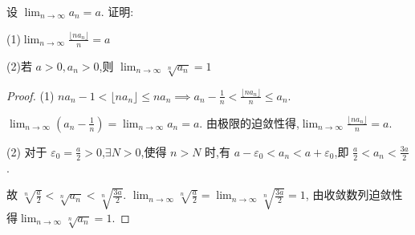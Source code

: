 \begin{practice}
    设 $\lim_{n\to\infty} a_n=a$. 证明:

    (1)$\lim_{n\to\infty} \frac{\lfloor na_n\rfloor}{n}=a$

    (2)若 $a>0,a_n>0$,则 $\lim_{n\to\infty} \sqrt[n]{a_n}=1$
\end{practice}

\begin{proof}
    (1) $na_n-1<\lfloor na_n \rfloor \le na_n \implies a_n-\frac{1}{n}<\frac{\lfloor na_n\rfloor}{n}\le a_n$.

    $\lim_{n\to\infty} (a_n-\frac{1}{n}) = \lim_{n\to\infty} a_n =a$. 由极限的迫敛性得,$\lim_{n\to\infty} \frac{\lfloor na_n\rfloor}{n}=a$.

    (2) 对于 $\varepsilon_0=\frac{a}{2}>0$,$\exists N>0$,使得 $n>N$ 时,有 $a-\varepsilon_0<a_n<a+\varepsilon_0$,即 $\frac{a}{2}<a_n<\frac{3a}{2}$. 
    
    故 $\sqrt[n]{\frac{a}{2}}<\sqrt[n]{a_n}<\sqrt[n]{\frac{3a}{2}}$. $\lim_{n\to\infty} \sqrt[n]{\frac{a}{2}}=\lim_{n\to\infty} \sqrt[n]{\frac{3a}{2}}=1$, 由收敛数列迫敛性得$\lim_{n\to\infty} \sqrt[n]{a_n}=1$.
\end{proof}